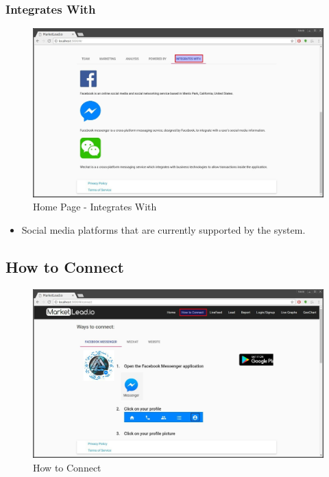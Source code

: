 \documentclass{article}
\begin{document}
			\subsubsection{Integrates With}
				\begin{figure}[H]
					\includegraphics[width=\textwidth]{images/home_integrates_with.jpg}
					\caption{Home Page - Integrates With}
				\end{figure}

				\begin{itemize}
					\item Social media platforms that are currently supported by the system.
				\end{itemize}

		\subsection{How to Connect}
			\begin{figure}[H]
				\includegraphics[width=\textwidth]{images/how_to_connect.jpg}
				\caption{How to Connect}
			\end{figure}
\end{document}
